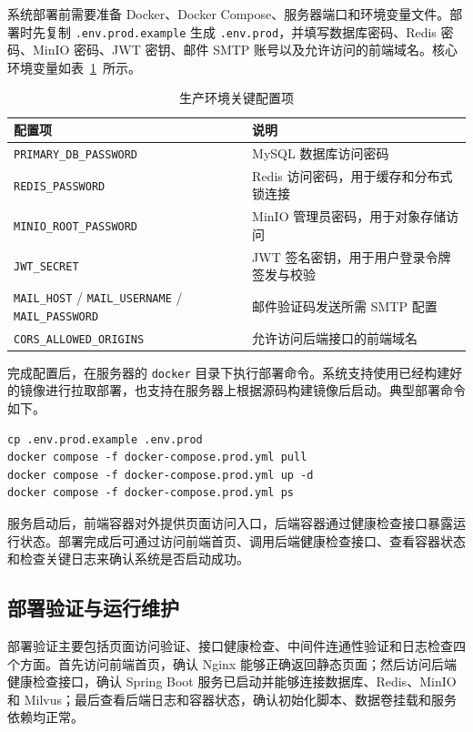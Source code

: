 系统部署前需要准备 Docker、Docker Compose、服务器端口和环境变量文件。部署时先复制 \texttt{.env.prod.example} 生成 \texttt{.env.prod}，并填写数据库密码、Redis 密码、MinIO 密码、JWT 密钥、邮件 SMTP 账号以及允许访问的前端域名。核心环境变量如表~\ref{tab:deploy_env}~所示。

\begin{table}[H]
  \centering
  \caption{生产环境关键配置项}
  \label{tab:deploy_env}
  \small
  \begin{tabular}{p{3.8cm}p{7.2cm}}
    \toprule
    配置项 & 说明 \\
    \midrule
    \texttt{PRIMARY\_DB\_PASSWORD} & MySQL 数据库访问密码 \\
    \texttt{REDIS\_PASSWORD} & Redis 访问密码，用于缓存和分布式锁连接 \\
    \texttt{MINIO\_ROOT\_PASSWORD} & MinIO 管理员密码，用于对象存储访问 \\
    \texttt{JWT\_SECRET} & JWT 签名密钥，用于用户登录令牌签发与校验 \\
    \texttt{MAIL\_HOST} / \texttt{MAIL\_USERNAME} / \texttt{MAIL\_PASSWORD} & 邮件验证码发送所需 SMTP 配置 \\
    \texttt{CORS\_ALLOWED\_ORIGINS} & 允许访问后端接口的前端域名 \\
    \bottomrule
  \end{tabular}
\end{table}

完成配置后，在服务器的 \texttt{docker} 目录下执行部署命令。系统支持使用已经构建好的镜像进行拉取部署，也支持在服务器上根据源码构建镜像后启动。典型部署命令如下。

\begin{lstlisting}[style=bash, caption={Docker Compose 生产部署命令}]
cp .env.prod.example .env.prod
docker compose -f docker-compose.prod.yml pull
docker compose -f docker-compose.prod.yml up -d
docker compose -f docker-compose.prod.yml ps
\end{lstlisting}

服务启动后，前端容器对外提供页面访问入口，后端容器通过健康检查接口暴露运行状态。部署完成后可通过访问前端首页、调用后端健康检查接口、查看容器状态和检查关键日志来确认系统是否启动成功。

\subsection{部署验证与运行维护}

部署验证主要包括页面访问验证、接口健康检查、中间件连通性验证和日志检查四个方面。首先访问前端首页，确认 Nginx 能够正确返回静态页面；然后访问后端健康检查接口，确认 Spring Boot 服务已启动并能够连接数据库、Redis、MinIO 和 Milvus；最后查看后端日志和容器状态，确认初始化脚本、数据卷挂载和服务依赖均正常。


